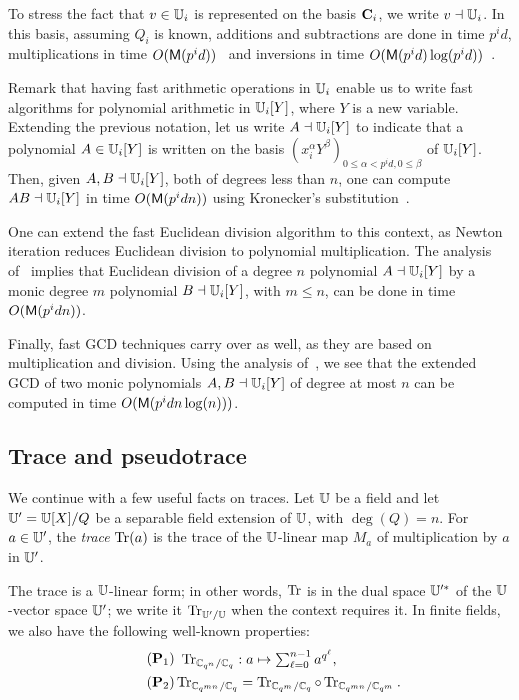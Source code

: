 To stress the fact that $v\in\mathbb{U}_i$ is represented on the basis
$\mathbf{C}_i$, we write $v\dashv\mathbb{U}_i$. In this basis, assuming $Q_i$ is known,
additions and subtractions are done in time $p^id$, multiplications in
time $O(\mathrm{\sf M}(p^id))$~\cite[Ch.~9]{vzGG} and inversions in time
$O(\mathrm{\sf M}(p^id)\log(p^id))$~\cite[Ch.~11]{vzGG}.

Remark that having fast arithmetic operations in $\mathbb{U}_i$ enable us to
write fast algorithms for polynomial arithmetic in $\mathbb{U}_i[Y]$, where
$Y$ is a new variable. Extending the previous notation, let us write
$A \dashv\mathbb{U}_i[Y]$ to indicate that a polynomial $A \in \mathbb{U}_i[Y]$ is
written on the basis $(x_i^\alpha Y^\beta)_{0 \le \alpha < p^id, 0 \le
  \beta}$ of $\mathbb{U}_i[Y]$.  Then, given $A,B \dashv \mathbb{U}_i[Y]$, both of
degrees less than $n$, one can compute $AB \dashv \mathbb{U}_i[Y]$ in time
$O(\mathrm{\sf M}(p^id n))$ using Kronecker's
substitution~\cite[Lemma~2.2]{GaSh92}.

One can extend the fast Euclidean division algorithm to this context,
as Newton iteration reduces Euclidean division to polynomial
multiplication. The analysis of~\cite[Ch.~9]{vzGG} implies that
Euclidean division of a degree $n$ polynomial $A \dashv \mathbb{U}_i[Y]$ by a
monic degree $m$ polynomial $B \dashv \mathbb{U}_i[Y]$, with $m \le n$, can be
done in time $O(\mathrm{\sf M}(p^id n))$.

Finally, fast GCD techniques carry over as well, as they are based on
multiplication and division. Using the analysis
of~\cite[Ch.~11]{vzGG}, we see that the extended GCD of two monic
polynomials $A,B \dashv \mathbb{U}_i[Y]$ of degree at most $n$ can be computed
in time $O(\mathrm{\sf M}(p^id n \log(n)))$.


\subsection{Trace and pseudotrace}\label{ssec:tpt}


We continue with a few useful facts on traces. Let $\mathbb{U}$ be a field and
let $\mathbb{U}'=\mathbb{U}[X]/Q$ be a separable field extension of $\mathbb{U}$, with
$\deg(Q)=n$. For $a \in \mathbb{U}'$, the {\em trace} $\operatorname{Tr}(a)$ is the trace of
the $\mathbb{U}$-linear map $M_a$ of multiplication by $a$ in $\mathbb{U}'$.

The trace is a $\mathbb{U}$-linear form; in other words, $\operatorname{Tr}$ is in the dual
space $\mathbb{U}'^\ast$ of the $\mathbb{U}$-vector space $\mathbb{U}'$; we write it
$\operatorname{Tr}_{\mathbb{U}'/\mathbb{U}}$ when the context requires it. In finite fields, we
also have the following well-known properties:
\begin{align}
  \tag{$\bP_1$} &\begin{array}{c}  
  \Tr_{\F_{q^n}/\F_q}: a \mapsto \sum_{\ell=0}^{n -
    1}a^{q^\ell} \text{,}
  \end{array}\\
  \tag{$\bP_2$}\label{eq:trcomp}
  &\Tr_{\F_{q^{mn}}/\F_q} = \Tr_{\F_{q^m}/\F_q} \circ
  \Tr_{\F_{q^{mn}}/\F_{q^m}}\text{.}
\end{align}

